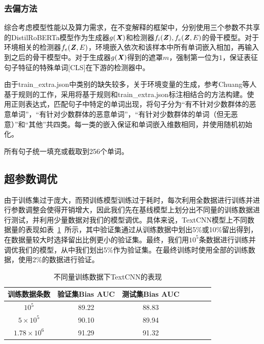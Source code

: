 \subsubsection{去偏方法}

综合考虑模型性能以及算力需求，在不变解释的框架中，分别使用三个参数不共享的DistilRoBERTa模型\cite{YinhanRoBERTa2019}作为生成器$g(\textbf{\textit{X}})$和检测器$f_i(\textbf{\textit{Z}}),f_e(\textbf{\textit{Z}},E)$的骨干模型。对于环境相关的检测器$f_e(\textbf{\textit{Z}},E)$，环境嵌入依次和该样本中所有单词嵌入相加，再输入到之后的骨干模型中。对于生成器$g(\textbf{\textit{X}})$得到的遮罩$m$，强制第一位为$1$，保证表征句子特征的特殊单词[CLS]在下游的检测器中。

由于train\_extra.json中类别的缺失较多，关于环境变量的生成，参考Chuang等人\cite{chuang2021mitigating}基于规则的工作，采用将基于规则和train\_extra.json标注相结合的方法构建。使用正则表达式，匹配句子中特定的单词出现，将句子分为``有不针对少数群体的恶意单词''，``有针对少数群体的恶意单词''，``有针对少数群体的单词（但无恶意）''和``其他''共四类。每一类的嵌入保证和单词嵌入维数相同，并使用随机初始化。

所有句子统一填充或截取到256个单词。

\subsection{超参数调优}

由于训练集过于庞大，而预训练模型训练过于耗时，每次利用全数据进行训练并进行参数调整会使得开销增大，因此我们先在基线模型上划分出不同量的训练数据进行测试，并利用少量数据对我们的模型调优。具体来说，TextCNN模型上不同数据量的表现如表~\ref{tab:textcnn}~所示，其中验证集通过从训练数据中划出5\%或10\%留出得到，在数据量较大时选择留出比例更小的验证集。最终，我们用$10^5$条数据进行训练并调优我们的模型，从中我们划出5\%作为验证集。在最终训练时使用全部的训练数据，使用2\%的数据进行验证。

\begin{table}[htbp]
    \centering
    \begin{tabular}{ccccccc}
        \toprule
        训练数据条数 & 验证集Bias AUC & 测试集Bias AUC \\
        \midrule
        $10^5$ & 89.22 & 88.83 \\
        $5\times 10^5$ & 90.10 & 89.94 \\
        $1.78\times 10^6$ & 91.29 & 91.32 \\
        \bottomrule
    \end{tabular}
    \caption{不同量训练数据下TextCNN的表现}
    \label{tab:textcnn}
\end{table}

